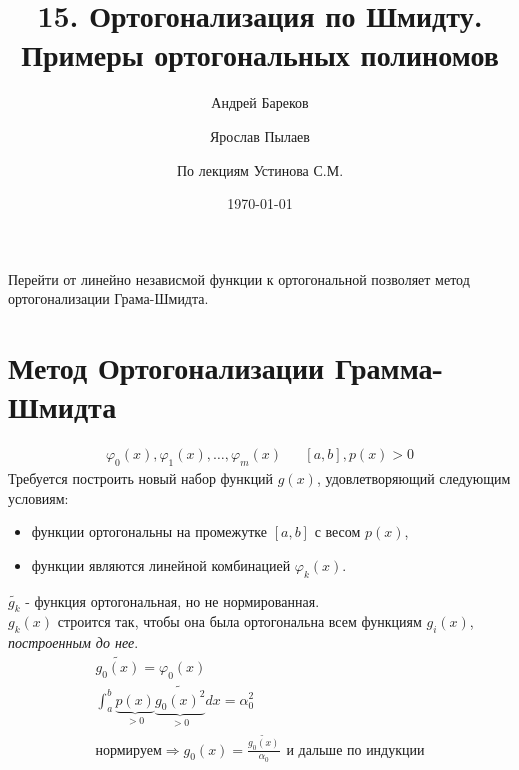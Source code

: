 \documentclass[a4paper,11pt]{article}
\title{15. Ортогонализация по Шмидту. Примеры ортогональных полиномов}
\author{Андрей Бареков \and Ярослав Пылаев \and По лекциям Устинова С.М.}
\date{\today}
\begin{document}
\maketitle
\newpage

Перейти от линейно независмой функции к ортогональной позволяет метод ортогонализации Грама-Шмидта.
\section{Метод Ортогонализации Грамма-Шмидта}
\begin{align*}
  \varphi_0(x), \varphi_1(x), \dots, \varphi_m(x) && [a,b], p(x)>0
\end{align*}
Требуется построить новый набор функций $g(x)$, удовлетворяющий следующим условиям:
\begin{itemize}
  \item функции ортогональны на промежутке $[a,b]$ с весом $p(x)$,
  \item функции являются линейной комбинацией $\varphi_k(x)$.
\end{itemize}
\vspace{5mm}
$\widetilde{g_k}$ - функция ортогональная, но не нормированная. \\
$g_k(x)$ строится так, чтобы она была ортогональна всем функциям $g_i(x)$, \textit{построенным до нее}.
\begin{gather*}
  \widetilde{g_0(x)} = \varphi_0(x) \\
  \int_a^b \underbrace{p(x)}_{>0}\underbrace{\widetilde{g_0(x)^2}}_{>0}dx = \alpha_0^2 \\
  \textit{нормируем} \Rightarrow g_0(x) = \frac{\widetilde{g_0(x)}}{\alpha_0} \hspace{5pt}\text{и дальше по индукции}
\end{gather*}
\end{document}
